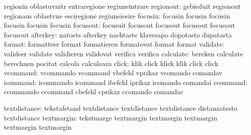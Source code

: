                            regionin                  oblastuvnitr
                           entraregione              regiuneintrare
                regionout: gebieduit                 regionout
                           regionaus                 oblastvne
                           esciregione               regiuneiesire
                  focusin: focusin                   focusin
                           focusin                   focusin
                           focusin                   focusin
                 focusout: focusuit                  focusout
                           focusout                  focusout
                           focusout                  focusout
                 afterkey: natoets                   afterkey
                           nachtaste                 klavesapo
                           dopotasto                 dupatasta
                   format: formatteer                format
                           formatieren               formatovat
                           format                    format %
                 validate: valideer                  validate
                           validieren                validovat
                           verifica                  verifica
                calculate: bereken                   calculate
                           berechnen                 pocitat
                           calcola                   calculeaza
                    click: klik                      click
                           klick                     klik
                           click                     click
                 vcommand: vcommando                 vcommand
                           vbefehl                   vprikaz
                           vcomando                  comandav
                 icommand: icommando                 icommand
                           ibefehl                   iprikaz
                           icomando                  comandai
                 ccommand: ccommando                 ccommand
                           cbefehl                   cprikaz
                           ccomando                  comandac

             textdistance: tekstafstand              textdistance
                           textdistance              textdistance
                           distanzatesto             textdistance %
               textmargin: tekstmarge                textmargin
                           textmargin                textmargin
                           textmargin                textmargin   %

